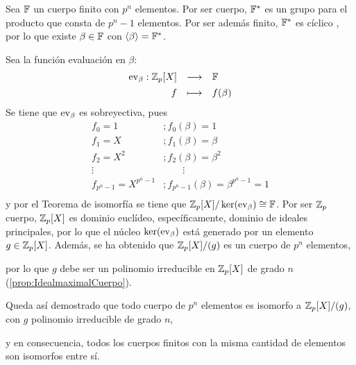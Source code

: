 \begin{dem}{\cite[p.~417]{GamboaAnillos}}
    Sea $\mathbb{F}$ un cuerpo finito con $p^n$ elementos. Por ser cuerpo, $\mathbb{F}^*$ es un grupo para el producto que consta de $p^n-1$ elementos. Por ser además finito, $\mathbb{F}^*$ es cíclico \cite[pp.~136-137]{Rosenberger}, por lo que existe $\beta\in\mathbb{F}$ con $\langle\beta\rangle = \mathbb{F}^*$.
    
    \item Sea la función evaluación en $\beta$:\vspace{-0.5em}
    \[
    \begin{array}{rcl}
    \operatorname{ev}_\beta: \mathbb{Z}_p[X] & \longrightarrow & \mathbb{F} \\[1ex]
    f & \longmapsto & f(\beta)
    \end{array}
    \]
    Se tiene que $\operatorname{ev}_\beta$ es sobreyectiva, pues \vspace{-0.5em}
    \[
    \begin{array}{ll}
    f_0 = 1&; f_0(\beta) =1 \\
    f_1 = X&; f_1(\beta) =\beta \\
    f_2 = X^2&; f_2(\beta) =\beta^2 \\
     \vdots\quad\quad   &\quad\quad\vdots\\
    f_{p^n-1} = X^{p^n-1}&; f_{p^n-1}(\beta) =\beta^{p^n-1} = 1 \\
    \end{array}
    \]    
    y por el Teorema de isomorfía se tiene que $\mathbb{Z}_p[X]/\ker(\operatorname{ev}_\beta) \cong \mathbb{F}$. Por ser $\mathbb{Z}_p$ cuerpo, $\mathbb{Z}_p[X]$ es dominio euclídeo, específicamente, dominio de ideales principales, por lo que el núcleo $\ker(\operatorname{ev}_\beta)$ está generado por un elemento $g\in\mathbb{Z}_p[X]$. Además, se ha obtenido que $\mathbb{Z}_p[X]/(g)$ es un cuerpo de $p^n$ elementos, \begin{Revision}por lo que $g$ debe ser un polinomio irreducible en $\mathbb{Z}_p[X]$ de grado $n$ (\ref{prop:IdealmaximalCuerpo}).\end{Revision} Queda así demostrado que todo cuerpo de $p^n$ elementos es isomorfo a  $\mathbb{Z}_p[X]/(g)$, con $g$ polinomio irreducible de grado $n$, \begin{Revision}y en consecuencia, todos los cuerpos finitos con la misma cantidad de elementos son isomorfos entre sí.\end{Revision}
\end{dem}

